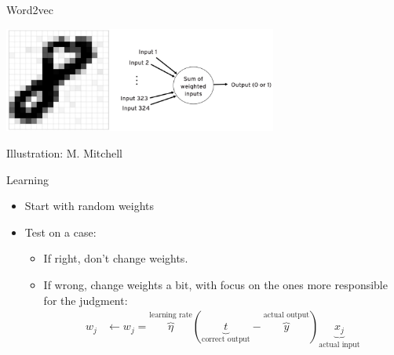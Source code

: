 \documentclass[
  10pt,
  ignorenonframetext,
  x11names, dvipsnames, bibspacing,natbib, table]{beamer}
\begin{document}
\begin{frame}{Word2vec}
\protect\hypertarget{word2vec-2}{}
\begin{center}
 \includegraphics[width = 9cm]{images/perceptron1.png}
\end{center}

\vspace{-3mm}

\tiny \hfill \color{gray}Illustration: M. Mitchell \color{black}

\footnotesize

\begin{block}{Learning}
\begin{itemize}
\item Start with random weights
\item Test on a case:
\begin{itemize}
\item If right, don't change weights.
\item If wrong, change weights a bit, with focus on the ones more responsible for the judgment:
\begin{align*}
w_j & \leftarrow w_j = \overbrace{\eta}^{\text{learning rate}}(\underbrace{t}_{\text{correct output}} - \overbrace{y}^{\text{actual output}})\underbrace{x_j}_{\text{actual input}}
\end{align*}
\end{itemize}
\end{itemize}

\end{block}
\end{frame}
\end{document}

